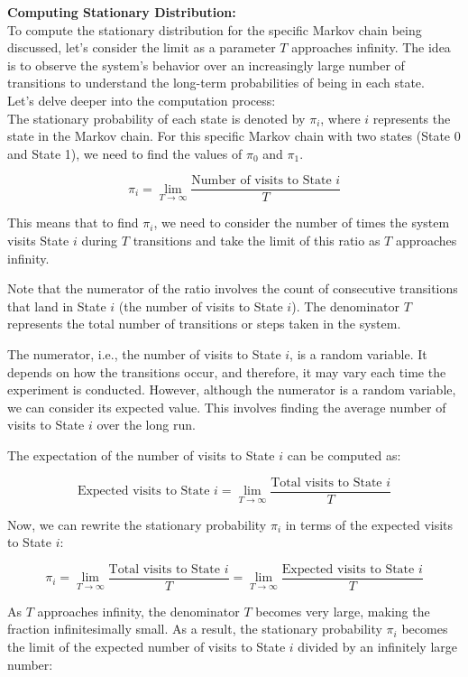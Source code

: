 \noindent
\textbf{Computing Stationary Distribution:}\\
To compute the stationary distribution for the specific Markov chain being discussed, let's consider the limit as a parameter $T$ approaches infinity. The idea is to observe the system's behavior over an increasingly large number of transitions to understand the long-term probabilities of being in each state.\\
Let's delve deeper into the computation process:\\
The stationary probability of each state is denoted by $\pi_i$, where $i$ represents the state in the Markov chain. For this specific Markov chain with two states (State 0 and State 1), we need to find the values of $\pi_0$ and $\pi_1$.

$$
\pi_i = \lim_{{T \to \infty}} \frac{{\text{Number of visits to State } i}}{{T}}
$$

This means that to find $\pi_i$, we need to consider the number of times the system visits State $i$ during $T$ transitions and take the limit of this ratio as $T$ approaches infinity.

Note that the numerator of the ratio involves the count of consecutive transitions that land in State $i$ (the number of visits to State $i$). The denominator $T$ represents the total number of transitions or steps taken in the system.

The numerator, i.e., the number of visits to State $i$, is a random variable. It depends on how the transitions occur, and therefore, it may vary each time the experiment is conducted. However, although the numerator is a random variable, we can consider its expected value. This involves finding the average number of visits to State $i$ over the long run.

The expectation of the number of visits to State $i$ can be computed as:

$$
\text{Expected visits to State } i = \lim_{{T \to \infty}} \frac{{\text{Total visits to State } i}}{{T}}
$$

Now, we can rewrite the stationary probability $\pi_i$ in terms of the expected visits to State $i$:

$$
\pi_i = \lim_{{T \to \infty}} \frac{{\text{Total visits to State } i}}{{T}} = \lim_{{T \to \infty}} \frac{{\text{Expected visits to State } i}}{{T}}
$$

As $T$ approaches infinity, the denominator $T$ becomes very large, making the fraction infinitesimally small. As a result, the stationary probability $\pi_i$ becomes the limit of the expected number of visits to State $i$ divided by an infinitely large number:

